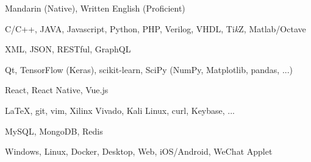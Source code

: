 
\begin{cvtbl}
        {Mandarin (Native), Written English (Proficient)}%

        {C/C++, JAVA, Javascript, Python, PHP, Verilog, VHDL, Ti\textit{k}Z, Matlab/Octave}

        {XML, JSON, RESTful, GraphQL}

        {Qt, TensorFlow (Keras), scikit-learn, SciPy (NumPy, Matplotlib, pandas, ...)}

        {React, React Native, Vue.js}

        {\LaTeX, git, vim, Xilinx Vivado, Kali Linux, curl, Keybase, ...}

        {MySQL, MongoDB, Redis}

        {Windows, Linux, Docker, Desktop, Web, iOS/Android, WeChat Applet}
\end{cvtbl}

\endinput